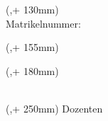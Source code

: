 \begin{textblock*}{\seitenbreite}(\bindekorrektur,\seitenanfang + 130mm)
  \centering\large
  \textbf{\srhautor} \\
  \vspace{2mm}
  Matrikelnummer: \srhmatnr
\end{textblock*}

\begin{textblock*}{\seitenbreite}(\bindekorrektur,\seitenanfang + 155mm)
  \centering\large
  \textsf{\srhdatum}
\end{textblock*}

\begin{textblock*}{\seitenbreite}(\bindekorrektur,\seitenanfang + 180mm)
  \centering\large\sffamily
  \srhkoerperschaft \\
  \vspace{2mm}
  \srhfakultaet \\
  \vspace{2mm}
  \srhstudiengang
\end{textblock*}

\begin{textblock*}{\seitenbreite}(\bindekorrektur,\seitenanfang + 250mm)
  \centering\large\sffamily
  Dozenten \\
  \vspace{2mm}
  \srhherbert \\
  \vspace{2mm}
  \srhfrank
\end{textblock*}

\null\newpage
\thispagestyle{empty}

\newcommand{\srhbib}{\begin{small}\textbf{\srhautorbib}: \\ \srhtitel \ / \srhautor. \ -- \\ \srhtyp, \srhort \: \srhkoerperschaft, \srhjahr. \pageref{lastpage} Seiten.\end{small}}
